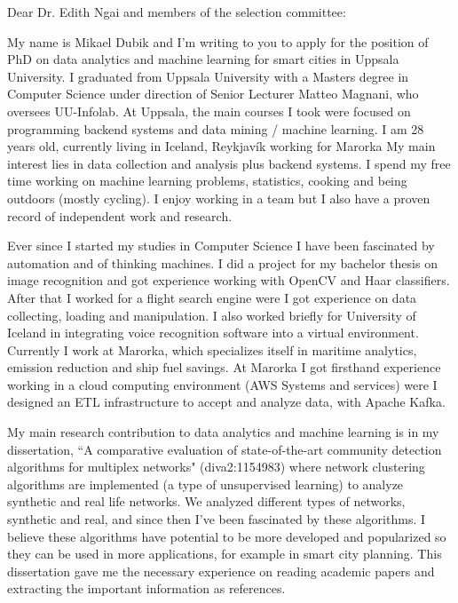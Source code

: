 



Dear Dr. Edith Ngai and members of the selection committee:

My name is Mikael Dubik and I'm writing to you to apply for the position of PhD on data analytics and machine learning for smart cities in Uppsala University. I graduated from Uppsala University with a Masters degree in Computer Science under direction of Senior Lecturer Matteo Magnani, who oversees UU-Infolab. At Uppsala, the main courses I took were focused on programming backend systems and data mining / machine learning. I am 28 years old, currently living in Iceland, Reykjavík working for Marorka My main interest lies in data collection and analysis plus backend systems. I spend my free time working on machine learning problems, statistics, cooking and being outdoors (mostly cycling). I enjoy working in a team but I also have a proven record of independent work and research.

Ever since I started my studies in Computer Science I have been fascinated by automation and of thinking machines. I did a project for my bachelor thesis on image recognition and got experience working with OpenCV and Haar classifiers. After that I worked for a flight search engine were I got experience on data collecting, loading and manipulation. I also worked briefly for University of Iceland in integrating voice recognition software into a virtual environment. Currently I work at Marorka, which specializes itself in maritime analytics, emission reduction and ship fuel savings. At Marorka I got firsthand experience working in a cloud computing environment (AWS Systems and services) were I designed an ETL infrastructure to accept and analyze data, with Apache Kafka.

My main research contribution to data analytics and machine learning is in my dissertation, ``A comparative evaluation of state-of-the-art community detection algorithms for multiplex networks" (diva2:1154983) where network clustering algorithms are implemented (a type of unsupervised learning) to analyze synthetic and real life networks. We analyzed different types of networks, synthetic and real, and since then I've been fascinated by these algorithms. I believe these algorithms have potential to be more developed and popularized so they can be used in more applications, for example in smart city planning. This dissertation gave me the necessary experience on reading academic papers and extracting the important information as references. 

